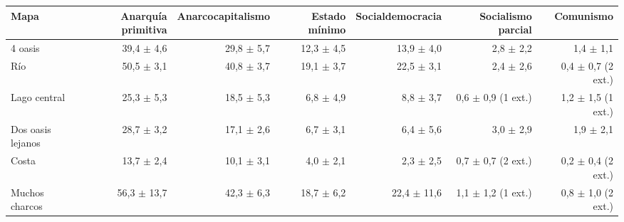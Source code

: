 \begin{tabular}{lrrrrrr}
\toprule
Mapa & Anarquía primitiva & Anarcocapitalismo & Estado mínimo & Socialdemocracia & Socialismo parcial & Comunismo \\
\midrule
4 oasis & 39,4 $\pm$ 4,6 & 29,8 $\pm$ 5,7 & 12,3 $\pm$ 4,5 & 13,9 $\pm$ 4,0 & 2,8 $\pm$ 2,2 & 1,4 $\pm$ 1,1 \\
Río & 50,5 $\pm$ 3,1 & 40,8 $\pm$ 3,7 & 19,1 $\pm$ 3,7 & 22,5 $\pm$ 3,1 & 2,4 $\pm$ 2,6 & 0,4 $\pm$ 0,7 (2 ext.) \\
Lago central & 25,3 $\pm$ 5,3 & 18,5 $\pm$ 5,3 & 6,8 $\pm$ 4,9 & 8,8 $\pm$ 3,7 & 0,6 $\pm$ 0,9 (1 ext.) & 1,2 $\pm$ 1,5 (1 ext.) \\
Dos oasis lejanos & 28,7 $\pm$ 3,2 & 17,1 $\pm$ 2,6 & 6,7 $\pm$ 3,1 & 6,4 $\pm$ 5,6 & 3,0 $\pm$ 2,9 & 1,9 $\pm$ 2,1 \\
Costa & 13,7 $\pm$ 2,4 & 10,1 $\pm$ 3,1 & 4,0 $\pm$ 2,1 & 2,3 $\pm$ 2,5 & 0,7 $\pm$ 0,7 (2 ext.) & 0,2 $\pm$ 0,4 (2 ext.) \\
Muchos charcos & 56,3 $\pm$ 13,7 & 42,3 $\pm$ 6,3 & 18,7 $\pm$ 6,2 & 22,4 $\pm$ 11,6 & 1,1 $\pm$ 1,2 (1 ext.) & 0,8 $\pm$ 1,0 (2 ext.) \\
\bottomrule
\end{tabular}
